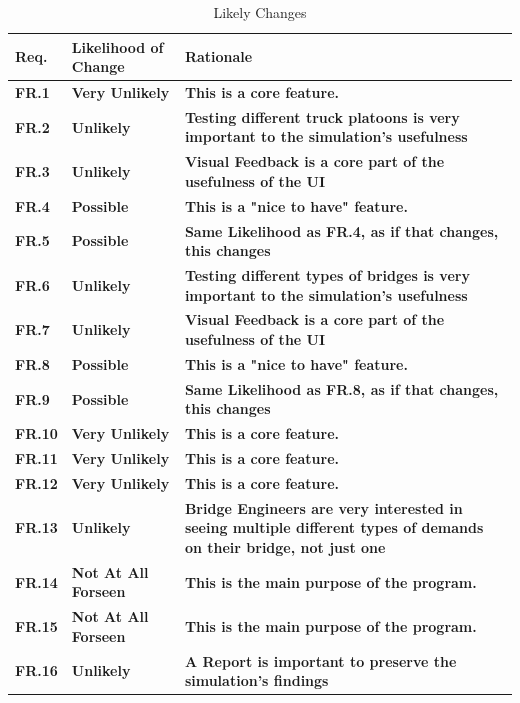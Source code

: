 \documentclass[12pt]{article}
\begin{document}
\begin{table}[H]
  \caption{Likely Changes} \label{TblLikelyChanges}
  \begin{tabular}{p{}|p{}|p{}}
  \toprule
  \textbf{Req.} & \textbf{Likelihood of Change} & \textbf{Rationale}\\
  \midrule
  \textbf{FR.1} & \textbf{Very Unlikely} & \textbf{This is a core feature.}\\
  \midrule
  \textbf{FR.2} & \textbf{Unlikely} & \textbf{Testing different truck platoons is very important to the simulation's usefulness}\\
  \midrule
  \textbf{FR.3} & \textbf{Unlikely} & \textbf{Visual Feedback is a core part of the usefulness of the UI}\\
  \midrule
  \textbf{FR.4} & \textbf{Possible} & \textbf{This is a "nice to have" feature.}\\
  \midrule
  \textbf{FR.5} & \textbf{Possible} & \textbf{Same Likelihood as FR.4, as if that changes, this changes}\\
  \midrule
  \textbf{FR.6} & \textbf{Unlikely} & \textbf{Testing different types of bridges is very important to the simulation's usefulness}\\
  \midrule
  \textbf{FR.7} & \textbf{Unlikely} & \textbf{Visual Feedback is a core part of the usefulness of the UI}\\
  \midrule
  \textbf{FR.8} & \textbf{Possible} & \textbf{This is a "nice to have" feature.}\\
  \midrule
  \textbf{FR.9} & \textbf{Possible} & \textbf{Same Likelihood as FR.8, as if that changes, this changes}\\
  \midrule
  \textbf{FR.10} & \textbf{Very Unlikely} & \textbf{This is a core feature.}\\
  \midrule
  \textbf{FR.11} & \textbf{Very Unlikely} & \textbf{This is a core feature.}\\
  \midrule
  \textbf{FR.12} & \textbf{Very Unlikely} & \textbf{This is a core feature.}\\
  \midrule
  \textbf{FR.13} & \textbf{Unlikely} & \textbf{Bridge Engineers are very interested in seeing multiple different types of demands on their bridge, not just one}\\
  \midrule
  \textbf{FR.14} & \textbf{Not At All Forseen} & \textbf{This is the main purpose of the program.}\\
  \midrule
  \textbf{FR.15} & \textbf{Not At All Forseen} & \textbf{This is the main purpose of the program.}\\
  \midrule
  \textbf{FR.16} & \textbf{Unlikely} & \textbf{A Report is important to preserve the simulation's findings}\\
  \bottomrule
\end{tabular}
\end{table}
\end{document}
